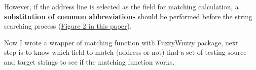 \documentclass[12pt]{article}
\begin{document}
However, if the address line is selected as the field for matching
calculation, a \textbf{substitution of common abbreviations} should be
performed before the string searching process
(\href{http://citeseerx.ist.psu.edu/viewdoc/download?doi=10.1.1.119.714&rep=rep1&type=pdf}{Figure
  2 in this paper}).

Now I wrote a wrapper of matching function with FuzzyWuzzy package,
next step is to know which field to match (address or not) find a set
of testing source and target strings to see if the matching function
works.

\newpage


\end{document}
